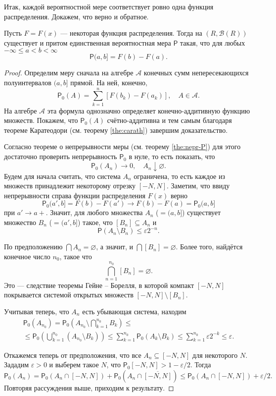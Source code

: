 Итак, каждой вероятностной мере соответствует ровно одна функция распределения.
Докажем, что верно и обратное. 
\begin{theorem}
  Пусть $ F = F(x) $ --- некоторая функция распределения. Тогда на $ (R,
  \mathscr B(R) ) $ существует и притом единственная вероятностная мера $
  \mathsf P $ такая, что для любых $ -\infty\leqslant a < b<\infty $ 
  \[
    \mathsf P(a, b] = F(b) - F(a).
  \]
\end{theorem}
\begin{proof}
Определим меру сначала на алгебре $ \mathscr A $ конечных сумм непересекающихся полуинтервалов
$ (a, b] $ прямой. На ней, конечно, 
\[
  \mathsf P_0(A) = \sum_{k=1}^n[F(b_k) - F(a_k)], \quad A \in \mathscr A.
\]
На алгебре $ \mathscr A $ эта формула однозначно определяет конечно-аддитивную функцию
множеств. Покажем, что $ \mathsf P_0(A) $ счётно-аддитивна и тем самым благодаря
теореме Каратеодори (см. теорему \ref{the:carath}) завершим
доказательство.

Согласно теореме о непрерывности меры (см. теорему \ref{the:nepr-P}) для этого
достаточно проверить непрерывность $ \mathsf P_0 $ в нуле, то есть показать,
что 
\[
    \mathsf P_0(A_n) \to 0, \quad A_n\downarrow\varnothing.
\]
Будем для начала считать, что система $ A_n $ ограничена, то есть каждое из
множеств принадлежит некоторому отрезку $ [-N, N] $. Заметим, что ввиду
непрерывности справа функции распределения $ F(x) $ верно 
\[
  \mathsf P_0(a', b] = F(b) - F(a') \to F(b) - F(a) = \mathsf P_0(a, b]
\]
при $ a' \to a+ $. Значит, для любого множества $ A_n $ ($ = (a, b] $) существует множество $
B_n $ ($ = (a', b] $) такое, что $ [B_n] \subseteq A_n $ и  
\[
  \mathsf P(A_n \setminus B_n) \leqslant \varepsilon 2^{-n}.
\]

По предположению $ \bigcap A_n = \varnothing $, а значит, и $ \bigcap [B_n] =
\varnothing $. Более того, найдётся конечное число $ n_0 $, такое что 
\[
  \bigcap_{n=1}^{n_0} [B_n] = \varnothing.
\]
Это --- следствие теоремы Гейне -- Борелля, в которой компакт $ [-N, N] $
покрывается системой открытых множеств $ [-N, N] \setminus [B_n] $.

Учитывая теперь, что $ A_n $ есть убывающая система, находим 
\begin{multline*}
  \mathsf P_0(A_{n_0}) = \mathsf P_0\left(A_{n_0} \setminus \bigcap_{k=1}^{n_0}
    B_k\right) \leqslant\\ \leqslant \mathsf P_0 \left( \bigcup_{k=1}^{n_0} (A_{n_0}
      \setminus
    B_k) \right) \leqslant \sum_{k=1}^{n_0} \mathsf P_0(A_k \setminus B_k)
    \leqslant \sum_{k=1}^{n_0} \varepsilon 2^{-k} \leqslant \varepsilon.
\end{multline*}

Откажемся теперь от предположения, что все $ A_n \subseteq [-N, N] $ для
некоторого $ N $. Зададим $ \varepsilon > 0 $ и выберем такое $ N $, что $
\mathsf P_0[-N, N] > 1 - \varepsilon/2 $. Тогда 
\[
  \mathsf P_0(A_n) = \mathsf P_0(A_n \cap [-N, N]) + \mathsf P_0(A_n \cap
  \overline{[-N, N]}) \leqslant \mathsf P_0(A_n \cap [-N, N]) + \varepsilon/2.
\]
Повторяя рассуждения выше, приходим к результату.
\end{proof}


